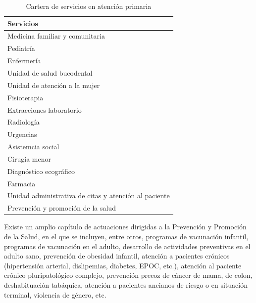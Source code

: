 \begin{table}[H]
    \centering
    \begin{tabular}{l}
        \toprule
        Servicios                                             \\
        \midrule
        Medicina familiar y comunitaria                       \\
        Pediatría                                             \\
        Enfermería                                            \\
        Unidad de salud bucodental                            \\
        Unidad de atención a la mujer                         \\
        Fisioterapia                                          \\
        Extracciones laboratorio                              \\
        Radiología                                            \\
        Urgencias                                             \\
        Asistemcia social                                     \\
        Cirugía menor                                         \\
        Diagnóstico ecográfico                                \\
        Farmacia                                              \\
        Unidad administrativa de citas y atención al paciente \\
        Prevención y promoción de la salud                    \\
        \bottomrule
    \end{tabular}
    \caption{Cartera de servicios en atención primaria}
    \label{tab:cartera-servicios}
\end{table}

Existe un amplio capítulo de actuaciones dirigidas a la Prevención y Promoción de la Salud, en el que se incluyen, entre otros, programas de vacunación infantil, programas de vacunación en el adulto, desarrollo de actividades preventivas en el adulto sano, prevención de obesidad infantil, atención a pacientes crónicos (hipertensión arterial, dislipemias, diabetes, EPOC, etc.), atención al paciente crónico pluripatológico complejo, prevención precoz de cáncer de mama, de colon, deshabituación tabáquica, atención a pacientes ancianos de riesgo o en situación terminal, violencia de género, etc.

